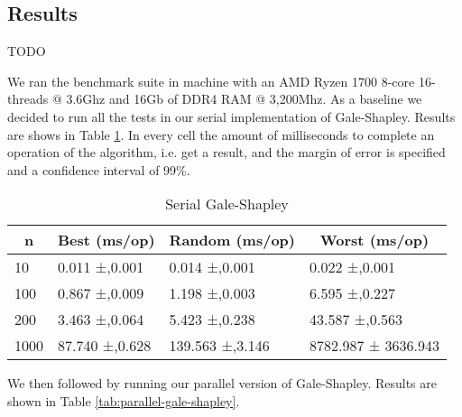 \subsection{Results}

TODO

We ran the benchmark suite in machine with an AMD Ryzen 1700 8-core 16-threads @ 3.6Ghz and 16Gb of DDR4 RAM @ 3,200Mhz. As a baseline we decided to run all the tests in our serial implementation of Gale-Shapley. Results are shows in Table \ref{tab:serial-gale-shapley}. In every cell the amount of milliseconds to complete an operation of the algorithm, i.e. get a result, and the margin of error is specified and a confidence interval of 99\%. 

\begin{table}[h]
    \centering
\begin{tabular}{|l|l|l|l|}
\hline
\multicolumn{1}{|c|}{\textbf{n}} & \multicolumn{1}{c|}{\textbf{Best (ms/op)}} & \multicolumn{1}{c|}{\textbf{Random (ms/op)}} & \multicolumn{1}{c|}{\textbf{Worst (ms/op)}} \\ \hline
10                               & 0.011 ±,0.001                              & 0.014 ±,0.001                                & 0.022 ±,0.001                               \\ \hline
100                              & 0.867 ±,0.009                              & 1.198 ±,0.003                                & 6.595 ±,0.227                               \\ \hline
200                              & 3.463 ±,0.064                              & 5.423 ±,0.238                                & 43.587 ±,0.563                              \\ \hline
1000                             & 87.740 ±,0.628                             & 139.563 ±,3.146                              & 8782.987 ± 3636.943                         \\ \hline
\end{tabular}
    \caption{Serial Gale-Shapley}
    \label{tab:serial-gale-shapley}
\end{table}

We then followed by running our parallel version of Gale-Shapley. Results are shown in Table \ref{tab:parallel-gale-shapley}.


